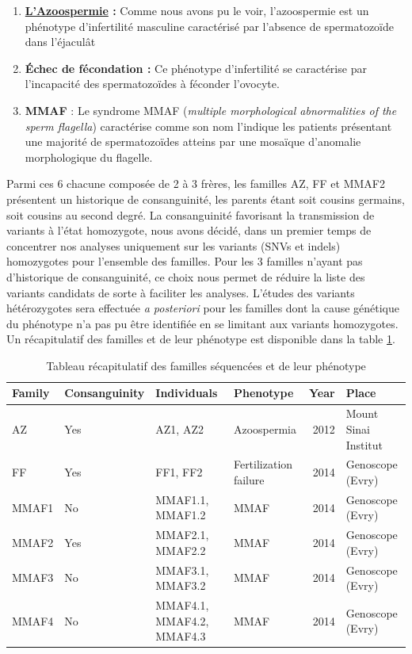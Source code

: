 \documentclass[12pt,twoside]{reedthesis}
\providecommand{\tightlist}{%
  \setlength{\itemsep}{0pt}\setlength{\parskip}{0pt}}
\theoremstyle{definition}
\theoremstyle{definition}
\theoremstyle{remark}
\begin{document}
  \begin{enumerate}
  \def\labelenumi{\arabic{enumi}.}
  \tightlist
  \item
    \textbf{\protect\hyperlink{infquant}{L'Azoospermie} :} Comme nous
    avons pu le voir, l'azoospermie est un phénotype d'infertilité
    masculine caractérisé par l'absence de spermatozoïde dans l'éjaculât\\
  \item
    \textbf{Échec de fécondation :} Ce phénotype d'infertilité se
    caractérise par l'incapacité des spermatozoïdes à féconder
    l'ovocyte.\\
  \item
    \textbf{MMAF} : Le syndrome MMAF (\emph{multiple morphological
    abnormalities of the sperm flagella}) caractérise comme son nom
    l'indique les patients présentant une majorité de spermatozoïdes
    atteins par une mosaïque d'anomalie morphologique du flagelle.
  \end{enumerate}
  
  Parmi ces 6 chacune composée de 2 à 3 frères, les familles AZ, FF et
  MMAF2 présentent un historique de consanguinité, les parents étant soit
  cousins germains, soit cousins au second degré. La consanguinité
  favorisant la transmission de variants à l'état homozygote, nous avons
  décidé, dans un premier temps de concentrer nos analyses uniquement sur
  les variants (SNVs et indels) homozygotes pour l'ensemble des familles.
  Pour les 3 familles n'ayant pas d'historique de consanguinité, ce choix
  nous permet de réduire la liste des variants candidats de sorte à
  faciliter les analyses. L'études des variants hétérozygotes sera
  effectuée \emph{a posteriori} pour les familles dont la cause génétique
  du phénotype n'a pas pu être identifiée en se limitant aux variants
  homozygotes. Un récapitulatif des familles et de leur phénotype est
  disponible dans la table \ref{tab:tabrecapfam}.
  
  \newpage
  
  \begin{landscape}
  \begin{longtable}[t]{llllrl}
  \caption{\label{tab:tabrecapfam}Tableau récapitulatif des familles séquencées et de leur phénotype}\\
  \toprule
  Family & Consanguinity & Individuals & Phenotype & Year & Place\\
  \midrule
  AZ & Yes & AZ1, AZ2 & Azoospermia & 2012 & Mount Sinai Institut\\
  FF & Yes & FF1, FF2 & Fertilization failure & 2014 & Genoscope (Evry)\\
  MMAF1 & No & MMAF1.1, MMAF1.2 & MMAF & 2014 & Genoscope (Evry)\\
  MMAF2 & Yes & MMAF2.1, MMAF2.2 & MMAF & 2014 & Genoscope (Evry)\\
  MMAF3 & No & MMAF3.1, MMAF3.2 & MMAF & 2014 & Genoscope (Evry)\\
  MMAF4 & No & MMAF4.1, MMAF4.2, MMAF4.3 & MMAF & 2014 & Genoscope (Evry)\\
  \bottomrule
  \end{longtable}
  \end{landscape}
  
\end{document}
